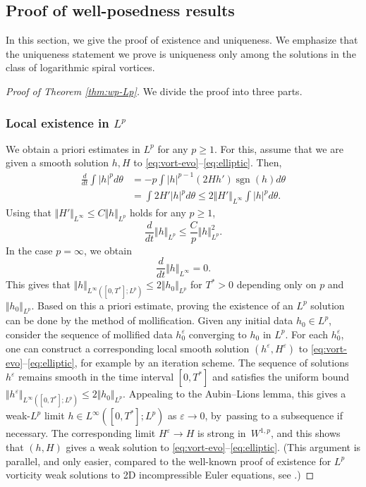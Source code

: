 \documentclass[10pt]{amsart}
\theoremstyle{plain}
\theoremstyle{definition}
\newcommand{\nrm}[1]{\Vert#1\Vert}
\DeclareMathOperator{\sgn}{sgn}
\let\tht\theta
\let\varep\varepsilon
\begin{document}
\subsection{Proof of well-posedness results}

In this section, we give the proof of exis\-tence and uniqueness. We emphasize that the uniqueness statement we prove is uniqueness only among the solutions in the class of logarithmic spiral vortices.

\begin{proof}[Proof of Theorem \ref{thm:wp-Lp}]

We divide the proof into three parts.

\subsubsection{Local existence in $L^p$}
We obtain a priori estimates in $L^p$ for any $p\ge1$. For this, assume that we are given a smooth solution $h, H$ to \eqref{eq:vort-evo}--\eqref{eq:elliptic}. Then,
\begin{equation}\label{eq:drv lp norm}
\begin{split}
\frac{d}{dt} \int |h|^p d\tht &= -p \int |h|^{p-1} (2H h') \sgn(h) d\tht\\
&= \int 2H' |h|^p d\tht \le 2\nrm{H'}_{L^\infty} \int |h|^p d\tht.
\end{split}
\end{equation}
Using that $\nrm{H'}_{L^\infty} \le C\nrm{h}_{L^p}$ holds for any $p\ge1$,
\begin{equation*}
\frac{d}{dt} \nrm{h}_{L^p} \le \frac{C}{p} \nrm{h}_{L^p}^2.
\end{equation*}
In the case $p=\infty$, we obtain
\begin{equation*}
\frac{d}{dt} \nrm{h}_{L^\infty} = 0.
\end{equation*}
This gives that $\nrm{h}_{L^\infty([0,T^*];L^p)} \le 2\nrm{h_0}_{L^p}$ for $T^*>0$ depending only on $p$ and $\nrm{h_0}_{L^p}$. Based on this a priori estimate, proving the existence of an $L^p$ solution can be done by the method of mollification. Given any initial data $h_0 \in L^p$, consider the sequence of mollified data $h_0^{\varep}$ converging to $h_0$ in $L^p$. For each $h_0^\varep$, one can construct a corresponding local smooth solution $(h^\varep,H^\varep)$ to \eqref{eq:vort-evo}--\eqref{eq:elliptic}, for example by an iteration scheme. The sequence of solutions $h^\varep$ remains smooth in the time interval $[0,T^*]$ and satisfies the uniform bound $\nrm{h^\varep}_{L^\infty([0,T^*];L^p)} \le 2\nrm{h_0}_{L^p}$. Appealing to the Aubin--Lions lemma, this gives a weak-$L^p$ limit $h \in L^\infty([0,T^*];L^p)$ as $\varep\to0$, by~passing to a subsequence if necessary. The corresponding limit $H^\varep\to H$ is strong in~$W^{1,p}$, and this shows that $(h,H)$ gives a weak solution to \eqref{eq:vort-evo}--\eqref{eq:elliptic}. (This argument is parallel, and only easier, compared to the well-known proof of existence for $L^p$ vorticity weak solutions to 2D incompressible Euler equations, see \cite{MB}.)


\end{proof}
\end{document}
